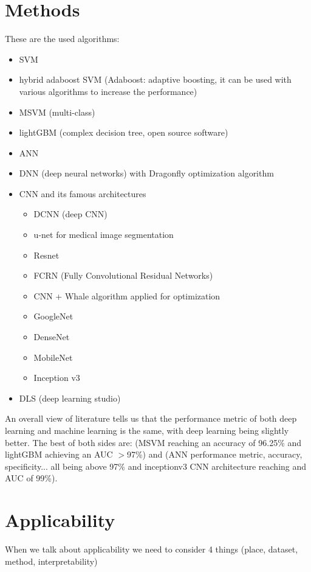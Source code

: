 \section{Methods}
    These are the used algorithms:
    \begin{itemize}
        \item SVM 
        \item hybrid adaboost SVM (Adaboost: adaptive boosting, it can be used with various algorithms to increase the performance)
        \item MSVM (multi-class) 
        \item lightGBM (complex decision tree, open source software) 
        \item ANN
        \item DNN (deep neural networks) with Dragonfly optimization algorithm 
        \item CNN and its famous architectures 
        \begin{itemize}
            \item DCNN (deep CNN) 
            \item u-net for medical image segmentation
            \item Resnet 
            \item FCRN (Fully Convolutional Residual Networks) 
            \item CNN + Whale algorithm applied for optimization
            \item GoogleNet 
            \item DenseNet 
            \item MobileNet 
            \item Inception v3
        \end{itemize}
        \item DLS (deep learning studio) 
    \end{itemize}
    An overall view of literature tells us that the performance metric of both deep learning and machine learning is the same, with deep learning being slightly better. The best of both sides are: (MSVM reaching an accuracy of 96.25\% and lightGBM achieving an AUC $>$97\%) and (ANN performance metric, accuracy, specificity... all being above 97\% and inceptionv3 CNN architecture reaching and AUC of 99\%).


    
\section{Applicability}
    When we talk about applicability we need to consider 4 things (place, dataset, method, interpretability)
    
